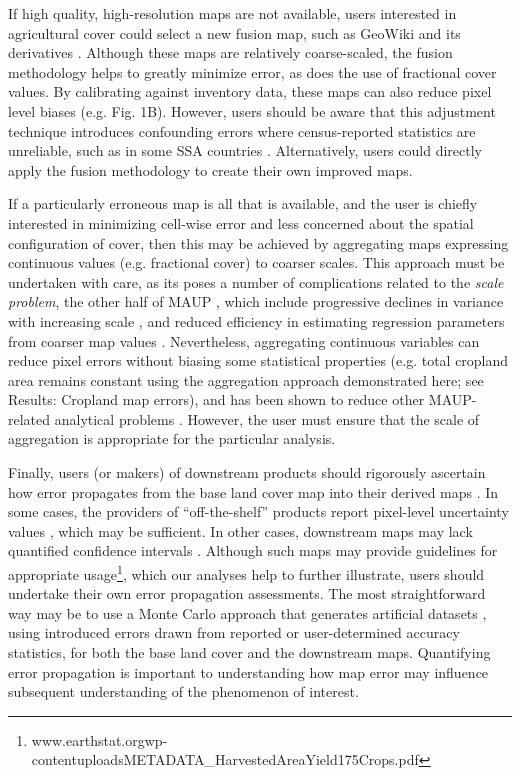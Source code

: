 \documentclass[a4paper]{article}
\begin{document}
If high quality, high-resolution maps are not available, users interested in agricultural cover could select a new fusion map, such as GeoWiki and its derivatives \citep{fritz_mapping_2015,waldner_unified_2016}. Although these maps are relatively coarse-scaled, the fusion methodology helps to greatly minimize error, as does the use of fractional cover values.  By calibrating against inventory data, these maps can also reduce pixel level biases (e.g. Fig. 1B). However, users should be aware that this adjustment technique introduces confounding errors where census-reported statistics are unreliable, such as in some SSA countries \citep{carletto_emperor_2013,carletto_guesstimates_2015}.  Alternatively, users could directly apply the fusion methodology \citep{fritz_cropland_2011} to create their own improved maps. 

If a particularly erroneous map is all that is available, and the user is chiefly interested in minimizing cell-wise error and less concerned about the spatial configuration of cover, then this may be achieved by aggregating maps expressing continuous values (e.g. fractional cover) to coarser scales. This approach must be undertaken with care, as its poses a number of complications related to the \emph{scale problem}, the other half of MAUP \citep{openshaw_million_1979}, which include progressive declines in variance with increasing scale \citep[even if means remain constant;][]{dark_modifiable_2007}, and reduced efficiency in estimating regression parameters from coarser map values \citep[][]{avelino_goldilocks_2016}. Nevertheless, aggregating continuous variables can reduce pixel errors without biasing some statistical properties (e.g. total cropland area remains constant using the aggregation approach demonstrated here; see Results: Cropland map errors), and has been shown to reduce other MAUP-related analytical problems \citep{avelino_goldilocks_2016}. However, the user must ensure that the scale of aggregation is appropriate for the particular analysis.   

Finally, users (or makers) of downstream products should rigorously ascertain how error propagates from the base land cover map into their derived maps \citep{verburg_challenges_2011}. In some cases, the providers of ``off-the-shelf'' products report pixel-level uncertainty values \citep[e.g.][]{ramankutty_farming_2008}, which may be sufficient.  In other cases, downstream maps may lack quantified confidence intervals \citep[e.g.][]{monfreda_farming_2008}. Although such maps may provide guidelines for appropriate usage\footnote{www.earthstat.org\/wp-content\/uploads\/METADATA\_HarvestedAreaYield175Crops.pdf}, which our analyses help to further illustrate, users should undertake their own error propagation assessments. The most straightforward way may be to use a Monte Carlo approach that generates artificial datasets \citep[e.g.][]{avelino_goldilocks_2016}, using introduced errors drawn from reported or user-determined accuracy statistics, for both the base land cover and the downstream maps. Quantifying error propagation is important to understanding how map error may influence subsequent understanding of the phenomenon of interest. 
\end{document}
